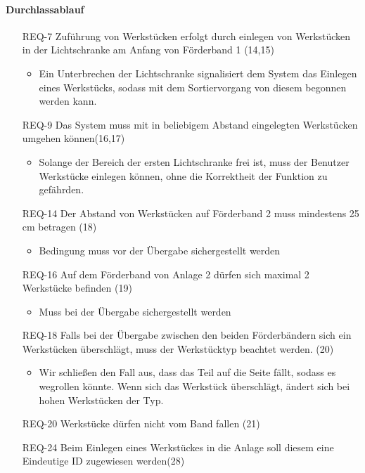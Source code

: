\paragraph{Durchlassablauf}
\begin{itemize}
    \item[REQ-7] Zuführung von Werkstücken erfolgt durch einlegen von Werkstücken in der Lichtschranke am Anfang von Förderband 1 (14,15)
    \begin{itemize}
        \item Ein Unterbrechen der Lichtschranke signalisiert dem System das Einlegen eines Werkstücks, sodass mit dem Sortiervorgang von diesem begonnen werden kann.
    \end{itemize}
    \item[REQ-9] Das System muss mit in beliebigem Abstand eingelegten Werkstücken umgehen können(16,17)
    \begin{itemize}
        \item Solange der Bereich der ersten Lichtschranke frei ist, muss der Benutzer Werkstücke einlegen können, ohne die Korrektheit der Funktion zu gefährden.
    \end{itemize}
    \item[REQ-14] Der Abstand von Werkstücken auf Förderband 2 muss mindestens 25 cm betragen (18)
    \begin{itemize}
        \item Bedingung muss vor der Übergabe sichergestellt werden
    \end{itemize}
    \item[REQ-16] Auf dem Förderband von Anlage 2 dürfen sich maximal 2 Werkstücke befinden (19)
    \begin{itemize}
        \item Muss bei der Übergabe sichergestellt werden
    \end{itemize}
    \item[REQ-18] Falls bei der Übergabe zwischen den beiden Förderbändern sich ein Werkstücken überschlägt, muss der Werkstücktyp beachtet werden. (20)
    \begin{itemize}
        \item Wir schließen den Fall aus, dass das Teil auf die Seite fällt, sodass es wegrollen könnte. Wenn sich das Werkstück überschlägt, ändert sich bei hohen Werkstücken der Typ.
    \end{itemize}
    \item[REQ-20] Werkstücke dürfen nicht vom Band fallen (21)
    \item[REQ-24] Beim Einlegen eines Werkstückes in die Anlage soll diesem eine Eindeutige ID zugewiesen werden(28)

\end{itemize}
